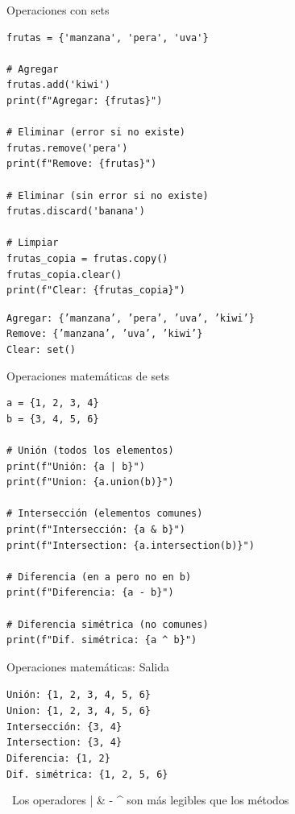 \documentclass{beamer}
\begin{document}
\begin{frame}[fragile]{Operaciones con sets \faTools}
\begin{lstlisting}
frutas = {'manzana', 'pera', 'uva'}

# Agregar
frutas.add('kiwi')
print(f"Agregar: {frutas}")

# Eliminar (error si no existe)
frutas.remove('pera')
print(f"Remove: {frutas}")

# Eliminar (sin error si no existe)
frutas.discard('banana')

# Limpiar
frutas_copia = frutas.copy()
frutas_copia.clear()
print(f"Clear: {frutas_copia}")
\end{lstlisting}

\vspace{-0.2cm}
\begin{tcolorbox}[colback=green!10,colframe=green,title={\small\faArrowCircleRight \ Salida},coltitle=fg0,left=3pt,right=3pt,top=2pt,bottom=2pt,boxsep=1pt]
\small\texttt{Agregar: \{'manzana', 'pera', 'uva', 'kiwi'\}\\
Remove: \{'manzana', 'uva', 'kiwi'\}\\
Clear: set()}
\end{tcolorbox}
\end{frame}

\begin{frame}[fragile]{Operaciones matemáticas de sets \faCalculator}
\begin{lstlisting}
a = {1, 2, 3, 4}
b = {3, 4, 5, 6}

# Unión (todos los elementos)
print(f"Unión: {a | b}")
print(f"Union: {a.union(b)}")

# Intersección (elementos comunes)
print(f"Intersección: {a & b}")
print(f"Intersection: {a.intersection(b)}")

# Diferencia (en a pero no en b)
print(f"Diferencia: {a - b}")

# Diferencia simétrica (no comunes)
print(f"Dif. simétrica: {a ^ b}")
\end{lstlisting}
\end{frame}

\begin{frame}[fragile]{Operaciones matemáticas: Salida \faArrowCircleRight}
\begin{tcolorbox}[colback=green!10,colframe=green,title={\small\faArrowCircleRight \ Salida},coltitle=fg0,left=3pt,right=3pt,top=3pt,bottom=3pt,boxsep=2pt]
\small\texttt{Unión: \{1, 2, 3, 4, 5, 6\}\\
Union: \{1, 2, 3, 4, 5, 6\}\\
Intersección: \{3, 4\}\\
Intersection: \{3, 4\}\\
Diferencia: \{1, 2\}\\
Dif. simétrica: \{1, 2, 5, 6\}}
\end{tcolorbox}

\vspace{0.3cm}
\begin{notebox}
\small\faLightbulb\ Los operadores | \& - \^{} son más legibles que los métodos
\end{notebox}
\end{frame}
\end{document}
